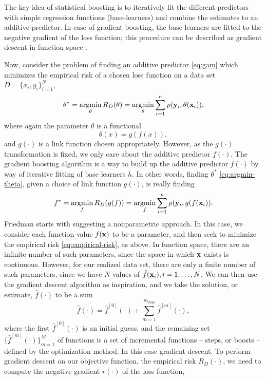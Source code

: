 The key idea of statistical boosting is to iteratively fit the different predictors with simple regression functions (base-learners) and combine the estimates to an additive predictor. In case of gradient boosting, the base-learners are fitted to the negative gradient of the loss function; this procedure can be described as gradient descent in function space \citep{buhlmann2007}.

Now, consider the problem of finding an additive predictor \eqref{eq:gam} which minimizes the empirical risk of a chosen loss function on a data set $D=\{x_i,y_i\}_{i=1}^N$,
\begin{equation}\label{eq:argmin-theta}
    \theta^*=\operatorname*{argmin}_{\theta}R_D(\theta)=\operatorname*{argmin}_{\theta}\sum_{i=1}^n\rho(\mathbf{y}_i,\theta(\mathbf{x}_i)),
\end{equation}
where again the parameter $\theta$ is a functional
\begin{equation}
    \theta(x)=g(f(x)),
\end{equation}
and $g(\cdot)$ is a link function chosen appropriately. However, as the $g(\cdot)$ transformation is fixed, we only care about the additive predictor $f(\cdot)$. The gradient boosting algorithm is a way to build up the additive predictor $f(\cdot)$ by way of iterative fitting of base learners $h$. In other words, finding $\theta^*$ \eqref{eq:argmin-theta}, given a choice of link function $g(\cdot)$, is really finding
\begin{equation}\label{eq:argmin-f}
    f^*=\operatorname*{argmin}_{f}R_D(g(f))=\operatorname*{argmin}_{f}\sum_{i=1}^n\rho(\mathbf{y}_i,g(f(\mathbf{x}_i)).
\end{equation}
Friedman starts with suggesting a nonparametric approach. In this case, we consider each function value $f(\mathbf{x})$ to be a parameter, and then seek to minimize the empirical risk \eqref{eq:empirical-risk}, as above. In function space, there are an infinite number of such parameters, since the space in which $\mathbf{x}$ exists is continuous. However, for our realized data set, there are only a finite number of such parameters, since we have $N$ values of $\hat{f}(\mathbf{x}_i),i=1,\ldots,N$. We can then use the gradient descent algorithm as inspiration, and we take the solution, or estimate, $\hat{f}(\cdot)$ to be a sum
\begin{equation}
    \hat{f}(\cdot)=\hat{f}^{[0]}(\cdot)+\sum_{m=1}^{m_{\text{stop}}} \hat{f}^{[m]}(\cdot),
\end{equation}
where the first $\hat{f}^{[0]}(\cdot)$ is an initial guess, and the remaining set $\{\hat{f}^{[m]}(\cdot)\}_{m=1}^M$ of functions is a set of incremental functions -- steps, or boosts -- defined by the optimization method. In this case gradient descent. To perform gradient descent on our objective function, the empirical risk $R_D(\cdot)$, we need to compute the negative gradient $r(\cdot)$ of the loss function,
